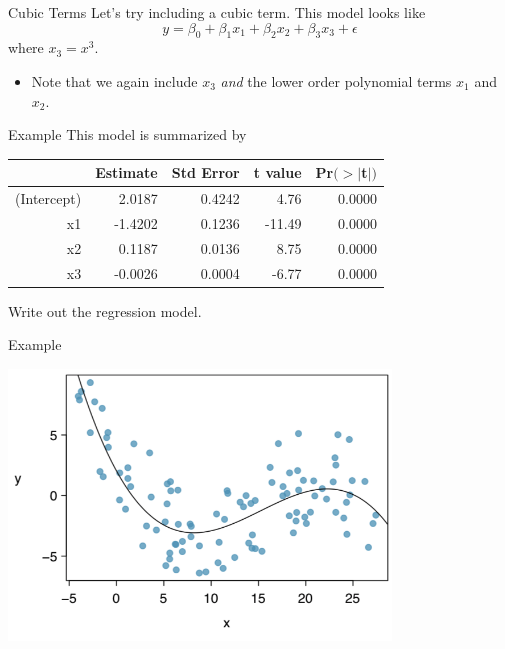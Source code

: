 \begin{frame}{Cubic Terms}
    Let's try including a cubic term. This model looks like
    \[
        y = \beta_0 + \beta_1x_1 + \beta_2x_2 + \beta_3x_3 + \epsilon
    \]
    where $x_3 = x^3$.
    
    \vspace{12pt}\begin{itemize}
        \item Note that we again include $x_3$ \textit{and} the lower order polynomial terms $x_1$ and $x_2$.
    \end{itemize}
\end{frame}

\begin{frame}{Example}
    This model is summarized by
    
    \begin{table}[h]
        \centering
        \begin{tabular}{r rrrr}
            \hline
             & Estimate & Std Error & t value & Pr$(>|$t$|)$ \\
            \hline
            (Intercept) & 2.0187 & 0.4242 & 4.76 & 0.0000 \\
            x1 & -1.4202 & 0.1236 & -11.49 & 0.0000 \\
            x2 & 0.1187 & 0.0136 & 8.75 & 0.0000 \\
            x3 & -0.0026 & 0.0004 & -6.77 & 0.0000 \\
            \hline
        \end{tabular}
    \end{table}
    Write out the regression model.
\end{frame}

\begin{frame}{Example}
    \begin{center}
        \includegraphics[width=4in]{images/nonlindata5.png}
    \end{center}
\end{frame}

